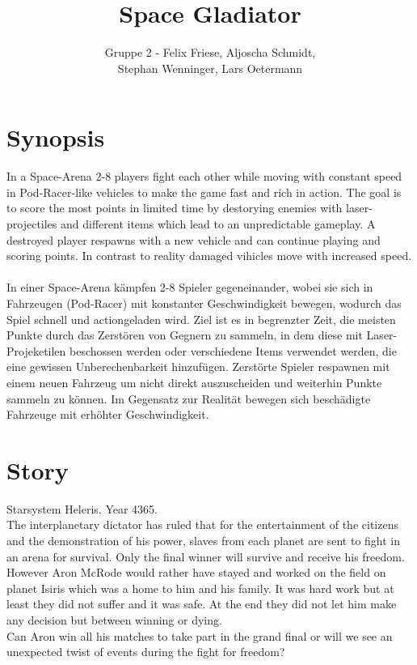 \documentclass[10pt,a4paper]{article}
\author{Gruppe 2 - Felix Friese, Aljoscha Schmidt,\\Stephan Wenninger, Lars Oetermann}
\title{Space Gladiator}
\begin{document}
\maketitle
\section{Synopsis}
In a Space-Arena 2-8 players fight each other while moving with constant speed in Pod-Racer-like vehicles to make the game fast and rich in action. The goal is to score the most points in limited time by destorying enemies with laser-projectiles and different items which lead to an unpredictable gameplay. A destroyed player respawns with a new vehicle and can continue playing and scoring points. In contrast to reality damaged vihicles move with increased speed.\\
\\
In einer Space-Arena kämpfen 2-8 Spieler gegeneinander, wobei sie sich in Fahrzeugen (Pod-Racer) mit konstanter Geschwindigkeit bewegen, wodurch das Spiel schnell und actiongeladen wird. Ziel ist es in begrenzter Zeit, die meisten Punkte durch das Zerstören von Gegnern zu sammeln, in dem diese mit Laser-Projeketilen beschossen werden oder verschiedene Items verwendet werden, die eine gewissen Unberechenbarkeit hinzufügen. Zerstörte Spieler respawnen mit einem neuen Fahrzeug um nicht direkt auszuscheiden und weiterhin Punkte sammeln zu können. Im Gegensatz zur Realität bewegen sich beschädigte Fahrzeuge mit erhöhter Geschwindigkeit.

\section{Story}
Starsystem Heleris. Year 4365.\\
The interplanetary dictator has ruled that for the entertainment of the citizens and the demonstration of his power, slaves from each planet are sent to fight in an arena for survival. Only the final winner will survive and receive his freedom.\\
However Aron McRode would rather have stayed and worked on the field on planet Isiris which was a home to him and his family. It was hard work but at least they did not suffer and it was safe. At the end they did not let him make any decision but between winning or dying.\\
Can Aron win all his matches to take part in the grand final or will we see an unexpected twist of events during the fight for freedom?
\end{document}
